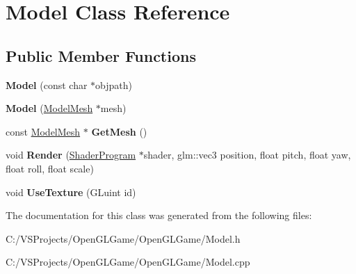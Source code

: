\hypertarget{class_model}{\section{Model Class Reference}
\label{class_model}
}
\subsection*{Public Member Functions}
\begin{DoxyCompactItemize}
\item 
\hypertarget{class_model_a7b5b25475e32ffb47203d69d5f5ed43a}{{\bfseries Model} (const char $\ast$objpath)}\label{class_model_a7b5b25475e32ffb47203d69d5f5ed43a}

\item 
\hypertarget{class_model_aa33286cbbc826bf15dd4b39435ccf71f}{{\bfseries Model} (\hyperlink{class_model_mesh}{Model\-Mesh} $\ast$mesh)}\label{class_model_aa33286cbbc826bf15dd4b39435ccf71f}

\item 
\hypertarget{class_model_a6f9084c275a4970a81f235bdda08e070}{const \hyperlink{class_model_mesh}{Model\-Mesh} $\ast$ {\bfseries Get\-Mesh} ()}\label{class_model_a6f9084c275a4970a81f235bdda08e070}

\item 
\hypertarget{class_model_a383ea6b8ad2ae1193b59f0baf72e6ef0}{void {\bfseries Render} (\hyperlink{class_shader_program}{Shader\-Program} $\ast$shader, glm\-::vec3 position, float pitch, float yaw, float roll, float scale)}\label{class_model_a383ea6b8ad2ae1193b59f0baf72e6ef0}

\item 
\hypertarget{class_model_a74a80abc127dd931f64004c63b802ce3}{void {\bfseries Use\-Texture} (G\-Luint id)}\label{class_model_a74a80abc127dd931f64004c63b802ce3}

\end{DoxyCompactItemize}


The documentation for this class was generated from the following files\-:\begin{DoxyCompactItemize}
\item 
C\-:/\-V\-S\-Projects/\-Open\-G\-L\-Game/\-Open\-G\-L\-Game/Model.\-h\item 
C\-:/\-V\-S\-Projects/\-Open\-G\-L\-Game/\-Open\-G\-L\-Game/Model.\-cpp\end{DoxyCompactItemize}

